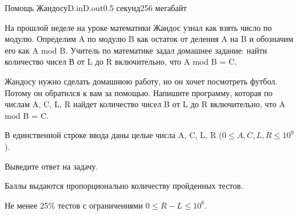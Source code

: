 \begin{problem}{Помощь Жандосу}{D.in}{D.out}{0.5 секунд}{256 мегабайт}

На прошлой неделе на уроке математики Жандос узнал как взять число по модулю. Определим A по модулю B как остаток от деления A на B и обозначим его как A mod B. Учитель по математике задал домашнее задание: найти количество чисел В от L до R включительно, что A mod B = C.

Жандосу нужно сделать домашнюю работу, но он хочет посмотреть футбол. Потому он обратился к вам за помощью. Напишите программу, которая по числам A, C, L, R найдет количество чисел B от L до R включительно, что A mod B = C.


\InputFile
В единственной строке ввода даны целые числа A, C, L, R ($0 \le A, C, L, R \le 10^9$).


\OutputFile
Выведите ответ на задачу.

\Examples

\begin{example}
%
%
\end{example}

\Note
\Scoring

Баллы выдаются пропорционально количеству пройденных тестов.

Не менее 25\% тестов с ограничениями $0 \le R - L \le 10^6$.

\end{problem}
